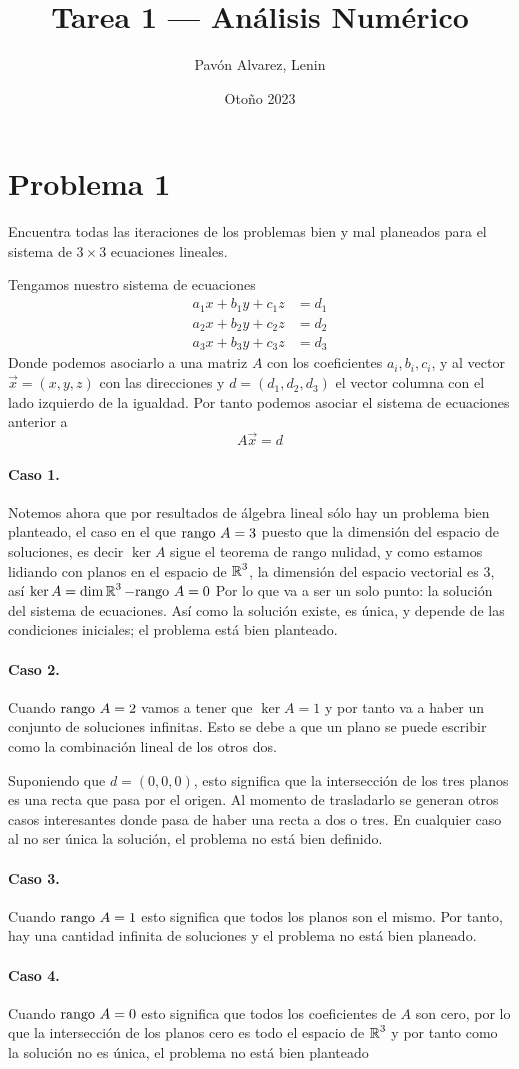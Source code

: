 \documentclass[a4paper,12pt]{article}
\title{Tarea 1 --- Análisis Numérico}
\author{
Pavón Alvarez, Lenin
}
\date{Otoño 2023}
\begin{document}
\maketitle
\section{Problema 1}
\begin{displayquote}
    Encuentra todas las iteraciones de los problemas bien y mal planeados para el sistema de $3\times 3$ ecuaciones lineales.
\end{displayquote}
Tengamos nuestro sistema de ecuaciones 
\begin{align*}
a_1x+b_1y+c_1z&=d_1\\
a_2x+b_2y+c_2z&=d_2\\
a_3x+b_3y+c_3z&=d_3
\end{align*}
Donde podemos asociarlo a una matriz $A$ con los coeficientes $a_i,b_i,c_i$, y al vector $\Vec{x}=(x,y,z)$ con las direcciones y $d=(d_1,d_2,d_3)$ el vector columna con el lado izquierdo de la igualdad. Por tanto podemos asociar el sistema de ecuaciones anterior a
\[A\Vec{x}=d\]
\paragraph{Caso 1.} Notemos ahora que por resultados de álgebra lineal sólo hay un problema bien planteado, el caso en el que $\textrm{rango\ } A=3$ puesto que la dimensión del espacio de soluciones, es decir $\ker A$ sigue el teorema de rango nulidad, y como estamos lidiando con planos en el espacio de $\operatorname{\mathbb{R}}^3$, la dimensión del espacio vectorial es $3$, así
$\ker A=\dim\operatorname{\mathbb{R}}^3-\textrm{rango\ } A=0$
Por lo que va a ser un solo punto: la solución del sistema de ecuaciones. Así como la solución existe, es única, y depende de las condiciones iniciales; el problema está bien planteado.
\paragraph{Caso 2.} Cuando $\textrm{rango\ } A=2$ vamos a tener que $\ker A=1$ y por tanto va a haber un conjunto de soluciones infinitas. Esto se debe a que un plano se puede escribir como la combinación lineal de los otros dos. 
\par Suponiendo que $d=(0,0,0)$, esto significa que la intersección de los tres planos es una recta que pasa por el origen. Al momento de trasladarlo se generan otros casos interesantes donde pasa de haber una recta a dos o tres. En cualquier caso al no ser única la solución, el problema no está bien definido.
\paragraph{Caso 3.} Cuando $\textrm{rango\ } A=1$ esto significa que todos los planos son el mismo. Por tanto, hay una cantidad infinita de soluciones y el problema no está bien planeado.
\paragraph{Caso 4.} Cuando $\textrm{rango\ } A=0$ esto significa que todos los coeficientes de $A$ son cero, por lo que la intersección de los planos cero es todo el espacio de $\operatorname{\mathbb{R}}^3$ y por tanto como la solución no es única, el problema no está bien planteado
\end{document}
